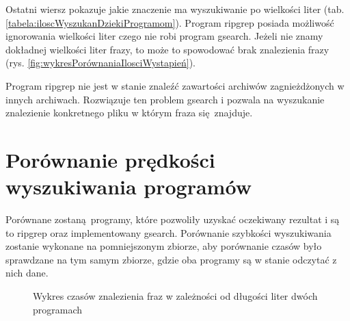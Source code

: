 Ostatni wiersz pokazuje jakie znaczenie ma wyszukiwanie po wielkości liter 
(tab. \ref{tabela:iloscWyszukanDziekiProgramom}). Program ripgrep posiada 
możliwość ignorowania wielkości liter czego nie robi program gsearch. Jeżeli
nie znamy dokładnej wielkości liter frazy, to może to spowodować brak 
znalezienia frazy (rys. \ref{fig:wykresPorównaniaIlosciWystapień}). 

Program ripgrep nie jest w stanie znaleźć zawartości archiwów zagnieżdżonych w
innych archiwach. Rozwiązuje ten problem gsearch i pozwala na wyszukanie 
znalezienie konkretnego pliku w którym fraza się znajduje.

\section{Porównanie prędkości wyszukiwania programów}

Porównane zostaną programy, które pozwoliły uzyskać oczekiwany rezultat i są to
ripgrep oraz implementowany gsearch. 
Porównanie szybkości wyszukiwania zostanie wykonane na pomniejszonym zbiorze,
aby porównanie czasów było sprawdzane na tym samym zbiorze, gdzie oba programy
są w stanie odczytać z nich dane.

\begin{figure}[ht]
    \centering
    \caption{Wykres czasów znalezienia fraz w zależności od długości liter dwóch programach}
    \label{fig:wykresPorównaniaCzasówWyszukań}
\end{figure}

